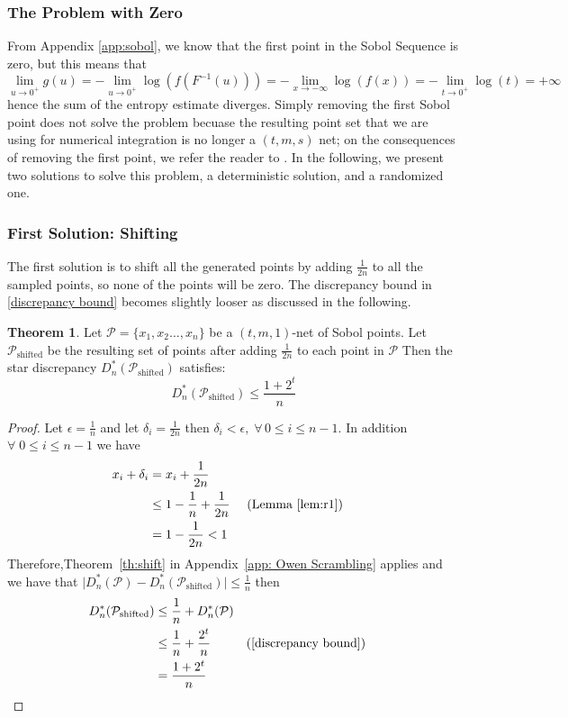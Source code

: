 \documentclass{article}
\theoremstyle{definition}
\newtheorem{theorem}[definition]{Theorem}
\begin{document}
\subsubsection{The Problem with Zero}
From Appendix \ref{app:sobol}, we know that the first point in the Sobol Sequence is zero, but this means that \begin{equation}
    \lim_{u\to0^{+}} g(u)=-\lim_{u\to0^{+}}\log\left(f(F^{-1}(u))\right)=-\lim_{x\to -\infty}\log(f(x))=-\lim_{t\to 0^{+}}\log(t)=+\infty
\end{equation} 
hence the sum of the entropy estimate  diverges. Simply removing the first Sobol point does not solve the problem becuase the resulting point set that we are using for numerical integration is no longer a \((t,m,s)\) net; on the consequences of removing the first point, we refer the reader to \cite{OwenArtB2021Odtf}. In the following, we present two solutions to solve this problem, a deterministic solution, and a randomized one.
\subsubsection{First Solution: Shifting}
The first solution is to shift all the generated points by adding $\frac{1}{2n}$ to all the sampled points, so none of the points will be zero. The discrepancy bound in \eqref{discrepancy bound} becomes slightly looser as discussed in the following.
 \begin{theorem}
  \label{th:r5}
 Let $\mathcal{P}=\{x_1,x_2\ldots,x_{n}\}$ be a $(t,m,1)$-net of Sobol points. Let $\mathcal{P}_{\text{shifted}}$ be the resulting set of points after adding $\frac{1}{2n}$ to each point in $\mathcal{P}$ Then the star discrepancy  $D^{\ast} _n(\mathcal{P}_{\text{shifted}})$ satisfies: 
 \begin{equation}
 \label{same bound two}
     D^{\ast} _n(\mathcal{P}_{\text{shifted}}) \leq \frac{1+2^{t}}{n}
 \end{equation}
\end{theorem}

\begin{proof}
Let $\epsilon=\frac{1}{n}$ and let $\delta_{i}=\frac{1}{2n}$ then $\delta_{i}< \epsilon, \;\forall \, 0\leq i\leq n-1$. In addition $\forall\; 0\leq i\leq n-1$  
 we have \begin{align*}
    x_{i}+\delta_{i}&=x_{i}+\frac{1}{2n}\\
    &\leq 1-\frac{1}{n}+\frac{1}{2n}&& \text{ (Lemma~\ref{lem:r1})}\\
    &= 1-\frac{1}{2n}<1
\end{align*}
\noindent Therefore,Theorem~\ref{th:shift} in Appendix~\ref{app: Owen Scrambling} applies and we have that $\lvert D_n^{\ast}(\mathcal{P}) - D_n^{\ast}(\mathcal{P}_{\text{shifted}})\rvert \leq \frac{1}{n}$  then \begin{align*}
D_n^{\ast}(\mathcal{P}_{\text{shifted}})&\leq \frac{1}{n} + D_n^{\ast}(\mathcal{P})\\
&\leq\frac{1}{n}+\frac{2^t}{n}&& (\ref{discrepancy bound})\\
&=\frac{1+2^{t}}{n}\end{align*}
\end{proof}
\end{document}
